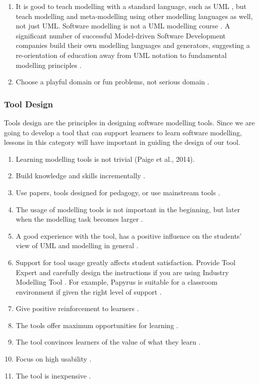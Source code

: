 \documentclass[12pt, a4paper]{report}
\begin{document}
\begin{enumerate}
\item It is good to teach modelling with a standard language, such as UML \cite{bezivin2009teaching}, but teach modelling and meta-modelling using other modelling languages as well, not just UML. Software modelling is not a UML modelling course \cite{paige2014bad}. A significant number of successful Model-driven Software Development companies build their own modelling languages and generators, suggesting a re-orientation of education away from UML notation to fundamental modelling principles \cite{whittle2013industrial}.
\item Choose a playful domain or fun problems, not serious domain \cite{paige2014bad}.
\end{enumerate}

\subsubsection{Tool Design}
Tools design are the principles in designing software modelling tools. Since we are going to develop a tool that can support learners to learn software modelling, lessons in this category will have important in guiding the design of our tool. 
\begin{enumerate}
\item Learning modelling tools is not trivial (Paige et al., 2014). 
\item Build knowledge and skills incrementally \cite{lethbridge2014teaching}.
\item Use papers, tools designed for pedagogy, or use mainstream tools \cite{Akayama2013}.
\item The usage of modelling tools is not important in the beginning, but later when the modelling task becomes larger \cite{bezivin2009teaching}.
\item A good experience with the tool, has a positive inﬂuence on the students’ view of UML and modelling in general \cite{liebel2015ready}.
\item Support for tool usage greatly affects student satisfaction. Provide Tool Expert and carefully design the instructions if you are using Industry Modelling Tool \cite{liebel2015ready}. For example, Papyrus is suitable for a classroom environment if given the right level of support \cite{liebel2015ready}.
\item Give positive reinforcement to learners \cite{lethbridge2014teaching}.
\item The tools offer maximum opportunities for learning \cite{lethbridge2014teaching}.
\item The tool convinces learners of the value of what they learn \cite{lethbridge2014teaching}.
\item Focus on high usability \cite{lethbridge2014teaching}.
\item The tool is inexpensive \cite{lethbridge2014teaching}.
\end{enumerate}
\end{document}
